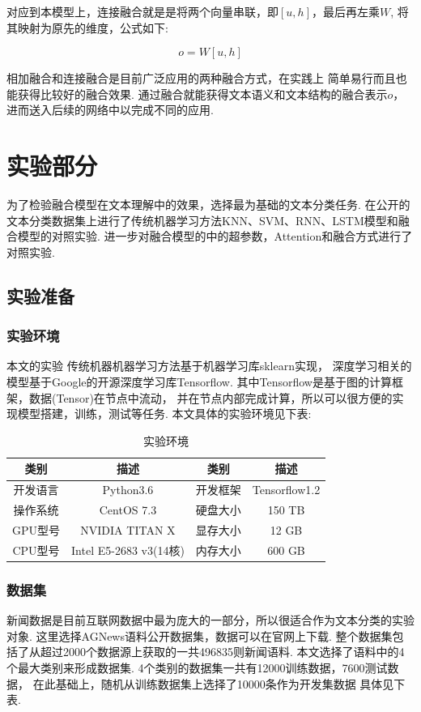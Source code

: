 \documentclass[bachelor,adobefonts]{jnuthesis}
\begin{document}
对应到本模型上，连接融合就是是将两个向量串联，即$[u,h]$，最后再左乘$W$,
将其映射为原先的维度，公式如下:

\begin{equation}
  o = W[u,h]
\end{equation}

相加融合和连接融合是目前广泛应用的两种融合方式，在实践上
简单易行而且也能获得比较好的融合效果.
通过融合就能获得文本语义和文本结构的融合表示$o$，进而送入后续的网络中以完成不同的应用.


\chapter{实验部分}
为了检验融合模型在文本理解中的效果，选择最为基础的文本分类任务.
在公开的文本分类数据集上进行了传统机器学习方法KNN、SVM、RNN、LSTM模型和融合模型的对照实验.
进一步对融合模型的中的超参数，Attention和融合方式进行了对照实验.

\section{实验准备}
\subsection{实验环境}
本文的实验
传统机器机器学习方法基于机器学习库sklearn实现，
深度学习相关的模型基于Google的开源深度学习库Tensorflow.
其中Tensorflow是基于图的计算框架，数据(Tensor)在节点中流动，
并在节点内部完成计算，所以可以很方便的实现模型搭建，训练，测试等任务.
本文具体的实验环境见下表:

\begin{table}[h!]
  \centering
  \begin{tabular}{cccc}
    \toprule
    \textbf{类别} & \textbf{描述} & \textbf{类别} & \textbf{描述}\\
    \midrule
    开发语言 & Python3.6  & 开发框架 & Tensorflow1.2\\
    操作系统 & CentOS 7.3 & 硬盘大小 & 150 TB \\
    GPU型号 & NVIDIA TITAN X & 显存大小 & 12 GB \\
    CPU型号 & Intel E5-2683 v3(14核) & 内存大小 & 600 GB\\
    \bottomrule
  \end{tabular}
  \caption{实验环境}
\end{table}

\subsection{数据集}
新闻数据是目前互联网数据中最为庞大的一部分，所以很适合作为文本分类的实验对象.
这里选择AGNews语料公开数据集，数据可以在官网上下载.
整个数据集包括了从超过2000个数据源上获取的一共496835则新闻语料.
本文选择了语料中的4个最大类别来形成数据集.
4个类别的数据集一共有12000训练数据，7600测试数据，
在此基础上，随机从训练数据集上选择了10000条作为开发集数据
具体见下表.
\end{document}
